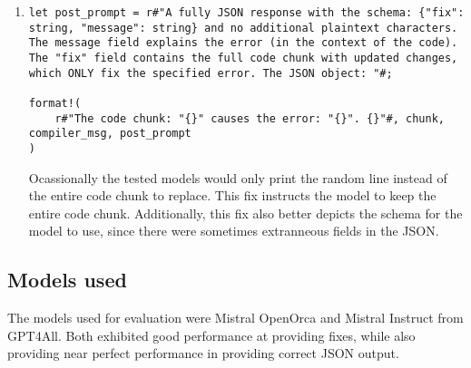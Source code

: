 \documentclass{article}
\begin{document}
\begin{enumerate}
			\item
			\begin{verbatim}
let post_prompt = r#"A fully JSON response with the schema: {"fix": string, "message": string} and no additional plaintext characters. The message field explains the error (in the context of the code). The "fix" field contains the full code chunk with updated changes, which ONLY fix the specified error. The JSON object: "#;

format!(
	r#"The code chunk: "{}" causes the error: "{}". {}"#, chunk, compiler_msg, post_prompt
)
			\end{verbatim}
			Ocassionally the tested models would only print the random line instead of the entire code chunk to replace. This fix instructs the model to keep the entire code chunk. Additionally, this fix also better depicts the schema for the model to use, since there were sometimes extranneous fields in the JSON.
		\end{enumerate}
	\subsection{Models used}
		The models used for evaluation were Mistral OpenOrca and Mistral Instruct from GPT4All. Both exhibited good performance at providing fixes, while also providing near perfect performance in providing correct JSON output.
\end{document}

